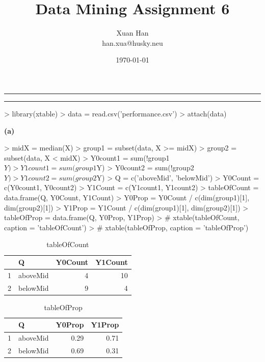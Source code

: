 \documentclass[a4paper]{article}
\makeatletter
\newcommand{\question}[2] {\vspace{.25in} \hrule\vspace{0.5em}
\noindent{\bf #1: #2} \vspace{0.5em}
\hrule \vspace{.10in}}
\renewcommand{\part}[1] {\vspace{.10in} {\bf (#1)}}
\newcommand{\myname}{Xuan Han}
\newcommand{\myhusky}{han.xua@husky.neu}
\newcommand{\myhwnum}{6}
\makeatother
\begin{document}


\title{Data Mining Assignment \myhwnum}
\author{\myname \\
        \myhusky}
\date{\today}
\maketitle

\thispagestyle{plain}


\question{1}{Employee}
\begin{Schunk}
\begin{Sinput}
> library(xtable)
> data = read.csv('performance.csv')
> attach(data)
\end{Sinput}
\end{Schunk}

\part{a}
\begin{Schunk}
\begin{Sinput}
> midX = median(X)
> group1 = subset(data, X >= midX)
> group2 = subset(data, X < midX)
> Y0count1 = sum(!group1$Y)
> Y1count1 = sum(group1$Y)
> Y0count2 = sum(!group2$Y)
> Y1count2 = sum(group2$Y)
> Q = c('aboveMid', 'belowMid')
> Y0Count = c(Y0count1, Y0count2)
> Y1Count = c(Y1count1, Y1count2)
> tableOfCount = data.frame(Q, Y0Count, Y1Count)
> Y0Prop = Y0Count / c(dim(group1)[1], dim(group2)[1])
> Y1Prop = Y1Count / c(dim(group1)[1], dim(group2)[1])
> tableOfProp = data.frame(Q, Y0Prop, Y1Prop)
> # xtable(tableOfCount, caption = 'tableOfCount')
> # xtable(tableOfProp, caption = 'tableOfProp')
\end{Sinput}
\end{Schunk}

\begin{table}[ht]
\centering
\begin{tabular}{rlrr}
  \hline
 & Q & Y0Count & Y1Count \\
  \hline
1 & aboveMid &   4 &  10 \\
  2 & belowMid &   9 &   4 \\
   \hline
\end{tabular}
\caption{tableOfCount}
\end{table}

\begin{table}[ht]
\centering
\begin{tabular}{rlrr}
  \hline
 & Q & Y0Prop & Y1Prop \\
  \hline
1 & aboveMid & 0.29 & 0.71 \\
  2 & belowMid & 0.69 & 0.31 \\
   \hline
\end{tabular}
\caption{tableOfProp}
\end{table}
\end{document}
